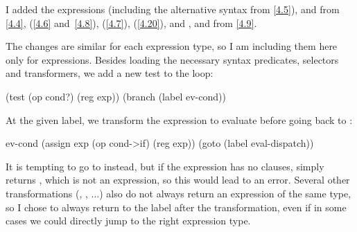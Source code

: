 \begin{exe}[5.23]
    I added the expressions  (including the alternative syntax from 
    \autoref{4.5}),  and  from \autoref{4.4},  
    (\ref{4.6} and~\ref{4.8}),  (\ref{4.7}),  
    (\ref{4.20}), and ,  and  from 
    \autoref{4.9}.

    The changes are similar for each expression type, so I am including them 
    here only for  expressions. Besides loading the necessary syntax 
    predicates, selectors and transformers, we add a new test to the 
     loop:
    \begin{cscm}
	(test (op cond?) (reg exp))
	(branch (label ev-cond))
    \end{cscm}
    At the given label, we transform the expression to evaluate before going 
    back to :
    \begin{cscm}
    ev-cond
        (assign exp (op cond->if) (reg exp))
        (goto (label eval-dispatch))
    \end{cscm}
    It is tempting to go to  instead, but if the  
    expression has no clauses,  simply returns , 
    which is not an  expression, so this would lead to an error. 
    Several other transformations (, , ...) also do 
    not always return an expression of the same type, so I chose to always 
    return to the  label after the transformation, even if 
    in some cases we could directly jump to the right expression type.
\end{exe}

